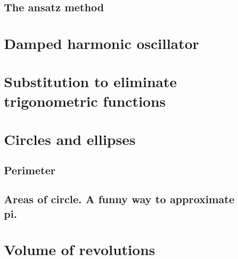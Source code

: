 \subsection{The ansatz method}

\section{Damped harmonic oscillator}

\section{Substitution to eliminate trigonometric functions}

\section{Circles and ellipses}

\subsection{Perimeter}

\subsection{Areas of circle. A funny way to approximate pi.}

\section{Volume of revolutions}
